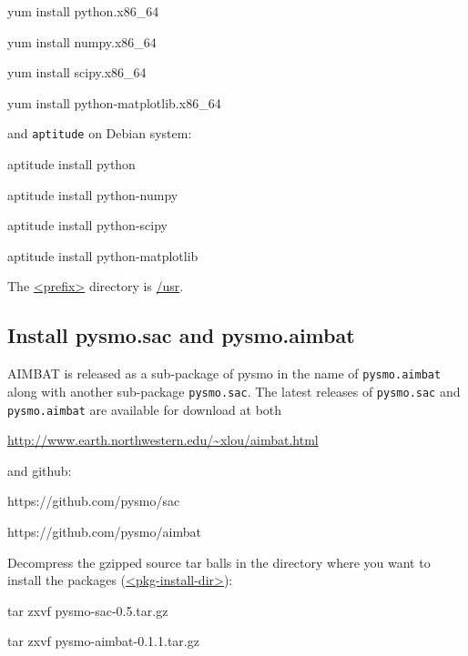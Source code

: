 \documentclass[12pt, titlepage]{article}
\newenvironment{lyxcode}
{\begin{list}{}{
\setlength{\rightmargin}{\leftmargin}
\setlength{\listparindent}{0pt}%
\raggedright
\setlength{\itemsep}{0pt}
\setlength{\parsep}{0pt}
\normalfont\ttfamily}%
 \item[]}
{\end{list}}
\begin{document}
\begin{lyxcode}

yum install python.x86\_64

yum install numpy.x86\_64

yum install scipy.x86\_64

yum install python-matplotlib.x86\_64

\end{lyxcode}

and \texttt{aptitude} on Debian system: 

\begin{lyxcode}
aptitude install python

aptitude install python-numpy

aptitude install python-scipy 

aptitude install python-matplotlib

\end{lyxcode}


The \url{<prefix>} directory is \url{/usr}.

\subsection{Install pysmo.sac and pysmo.aimbat}

AIMBAT is released as a sub-package of pysmo in the name of \texttt{pysmo.aimbat} along with another sub-package \texttt{pysmo.sac}.
The latest releases of \texttt{pysmo.sac} and \texttt{pysmo.aimbat} are available for download at both

\begin{lyxcode}
\url{http://www.earth.northwestern.edu/~xlou/aimbat.html}
\end{lyxcode}

and github:

\begin{lyxcode}
https://github.com/pysmo/sac

https://github.com/pysmo/aimbat
\end{lyxcode}


Decompress the gzipped source tar balls in the directory where you want to install the packages (\url{<pkg-install-dir>}):

\begin{lyxcode}
tar zxvf pysmo-sac-0.5.tar.gz

tar zxvf pysmo-aimbat-0.1.1.tar.gz
\end{lyxcode}
\end{document}
